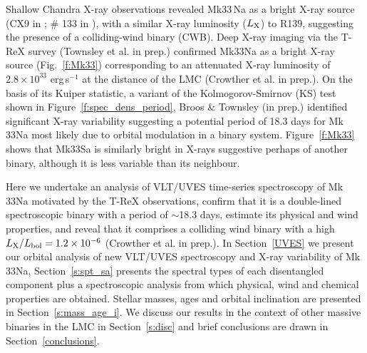 \documentclass[fleqn,usenatbib]{mnras}
\begin{document}
Shallow Chandra X-ray observations revealed Mk33\,Na as a  bright X-ray source (CX9 in \citealp{portegies2002}; \# 133 in \citealp{townsley2006}), with a similar X-ray luminosity ($L_{\rm X}$) to R139, suggesting the presence of a colliding-wind binary (CWB). Deep X-ray imaging via the T-ReX survey (Townsley et al. in prep.) confirmed Mk33Na as a bright X-ray source (Fig.~\ref{f:Mk33}) corresponding to an attenuated X-ray luminosity of $2.8 \times 10^{33}$ erg\,s$^{-1}$ at the distance of the LMC (Crowther et al. in prep.). 
On the basis of its Kuiper statistic,  a variant of the Kolmogorov-Smirnov (KS) test \citep{paltani2004} shown in Figure~\ref{f:spec_dens_period}, Broos \& Townsley (in prep.) identified significant X-ray variability suggesting a potential period of 18.3 days for Mk\,33Na most likely due to orbital modulation in a binary system. Figure~\ref{f:Mk33} shows that Mk33Sa is similarly bright in X-rays suggestive perhaps of another binary, although it is less variable than its neighbour.

Here we undertake an analysis of VLT/UVES time-series spectroscopy of Mk\,33Na motivated by the T-ReX observations, confirm that it is a double-lined spectroscopic binary with a period of $\sim$18.3 days, estimate its physical and wind properties, and reveal that it comprises a colliding wind binary with a high $L_{\rm X}/L_{\rm bol} = 1.2 \times 10^{-6}$ (Crowther et al. in prep.). In Section~\ref{UVES} we present our orbital analysis of new VLT/UVES spectroscopy and X-ray variability of Mk\,33Na, Section~\ref{s:spt_sa} presents the spectral types of each disentangled component plus a spectroscopic analysis from which physical, wind and chemical properties are obtained. Stellar masses, ages and orbital inclination are presented in Section~\ref{s:mass_age_i}. We discuss our results in the context of other massive binaries in the LMC in Section~\ref{s:disc} and brief conclusions are drawn in Section~\ref{conclusions}.


 
\end{document}
